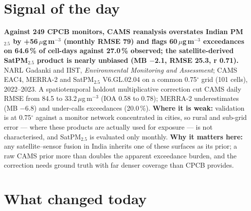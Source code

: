 \documentclass[10pt]{article}
\begin{document}
\vspace{6mm}

\section*{\sffamily\bfseries\color{Deep}Signal of the day}
\vspace{-1.5mm}{\color{Amber}\rule{\linewidth}{1.1pt}}\vspace{2.5mm}

\begin{keybox}
{\sffamily\bfseries\small\color{Deep}Against 249 CPCB monitors, CAMS reanalysis overstates Indian PM$_{2.5}$ by +56\,$\mu$g\,m$^{-3}$ (monthly RMSE 79) and flags 60\,$\mu$g\,m$^{-3}$ exceedances on 64.6\,\% of cell-days against 27.0\,\% observed; the satellite-derived SatPM$_{2.5}$ product is nearly unbiased (MB $-$2.1, RMSE 25.3, r 0.71).}\\[1.4mm]
\footnotesize
NARL Gadanki and IIST, \textit{Environmental Monitoring and Assessment}; CAMS EAC4, MERRA-2 and SatPM$_{2.5}$ V6.GL.02.04 on a common 0.75$^\circ$ grid (101 cells), 2022--2023. A spatiotemporal holdout multiplicative correction cut CAMS daily RMSE from 84.5 to 33.2\,$\mu$g\,m$^{-3}$ (IOA 0.58 to 0.78); MERRA-2 underestimates (MB $-$6.8) and under-calls exceedances (20.0\,\%).
\textbf{Where it is weak:} validation is at 0.75$^\circ$ against a monitor network concentrated in cities, so rural and sub-grid error --- where these products are actually used for exposure --- is not characterised, and SatPM$_{2.5}$ is evaluated only monthly.
\textbf{Why it matters here:} any satellite--sensor fusion in India inherits one of these surfaces as its prior; a raw CAMS prior more than doubles the apparent exceedance burden, and the correction needs ground truth with far denser coverage than CPCB provides.\par
\end{keybox}

\vspace{3mm}

\section*{\sffamily\bfseries\color{Deep}What changed today}
\vspace{-1.5mm}{\color{Amber}\rule{\linewidth}{1.1pt}}\vspace{2.5mm}
\end{document}
